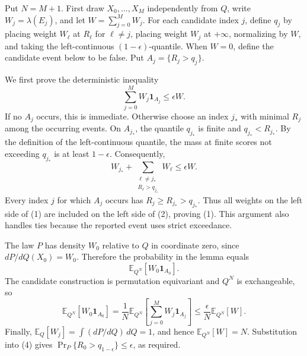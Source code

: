 Put \(N=M+1\). First draw \(X_0,\ldots,X_M\) independently from \(Q\), write \(W_j=\lambda(E_j)\), and let \(W=\sum_{j=0}^M W_j\). For each candidate index \(j\), define \(q_j\) by placing weight \(W_\ell\) at \(R_\ell\) for \(\ell\ne j\), placing weight \(W_j\) at \(+\infty\), normalizing by \(W\), and taking the left-continuous \((1-\epsilon)\)-quantile. When \(W=0\), define the candidate event below to be false. Put \(A_j=\{R_j>q_j\}\).

We first prove the deterministic inequality
\[
\sum_{j=0}^M W_j\mathbf 1_{A_j}\le\epsilon W.
\tag{1}
\]
If no \(A_j\) occurs, this is immediate. Otherwise choose an index \(j_*\) with minimal \(R_j\) among the occurring events. On \(A_{j_*}\), the quantile \(q_{j_*}\) is finite and \(q_{j_*}<R_{j_*}\). By the definition of the left-continuous quantile, the mass at finite scores not exceeding \(q_{j_*}\) is at least \(1-\epsilon\). Consequently,
\[
W_{j_*}+\sum_{\substack{\ell\ne j_*\\R_\ell>q_{j_*}}}W_\ell\le\epsilon W.
\tag{2}
\]
Every index \(j\) for which \(A_j\) occurs has \(R_j\ge R_{j_*}>q_{j_*}\). Thus all weights on the left side of (1) are included on the left side of (2), proving (1). This argument also handles ties because the reported event uses strict exceedance.

The law \(P\) has density \(W_0\) relative to \(Q\) in coordinate zero, since \(dP/dQ(X_0)=W_0\). Therefore the probability in the lemma equals
\[
\mathbb E_{Q^N}[W_0\mathbf 1_{A_0}].
\tag{3}
\]
The candidate construction is permutation equivariant and \(Q^N\) is exchangeable, so
\[
\mathbb E_{Q^N}[W_0\mathbf 1_{A_0}]=\frac1N\mathbb E_{Q^N}\left[\sum_{j=0}^M W_j\mathbf 1_{A_j}\right]\le\frac{\epsilon}{N}\mathbb E_{Q^N}[W].
\tag{4}
\]
Finally, \(\mathbb E_Q[W_j]=\int(dP/dQ)\,dQ=1\), and hence \(\mathbb E_{Q^N}[W]=N\). Substitution into (4) gives \(\Pr_P\{R_0>q_{1-\epsilon}\}\le\epsilon\), as required.